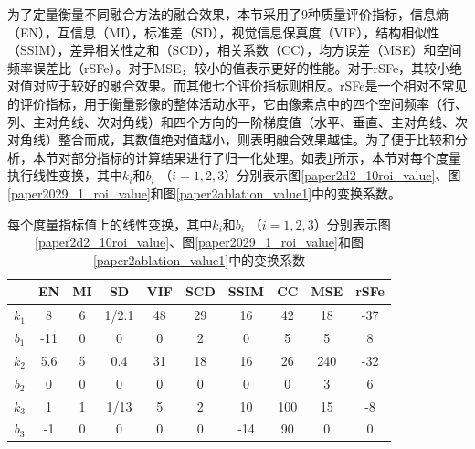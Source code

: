 为了定量衡量不同融合方法的融合效果，本节采用了9种质量评价指标，信息熵（EN）\cite{2008Assessment}，互信息（MI）\cite{2005Feature}，标准差（SD）\cite{Yun1997In}，视觉信息保真度（VIF）\cite{2013A}，结构相似性（SSIM）\cite{wang2004image}，差异相关性之和（SCD）\cite{Aslantas2015A}，相关系数（CC）\cite{han2008study}，均方误差（MSE）\cite{willmott2005advantages}和空间频率误差比（rSFe）\cite{2007A}。对于MSE，较小的值表示更好的性能。对于rSFe，其较小绝对值对应于较好的融合效果。而其他七个评价指标则相反。rSFe是一个相对不常见的评价指标，用于衡量影像的整体活动水平，它由像素点中的四个空间频率（行、列、主对角线、次对角线）和四个方向的一阶梯度值（水平、垂直、主对角线、次对角线）整合而成，其数值绝对值越小，则表明融合效果越佳。为了便于比较和分析，本节对部分指标的计算结果进行了归一化处理。如表\ref{lineTransformation}所示，本节对每个度量执行线性变换，其中$k_i$和$b_i$ （$i=1, 2, 3$）分别表示图\ref{paper2d2_10roi_value}、图\ref{paper2029_1_roi_value}和图\ref{paper2ablation_value1}中的变换系数。

\begin{table}[ht]
\centering
  \caption{每个度量指标值上的线性变换，其中$k_i$和$b_i$ （$i=1, 2, 3$）分别表示图\ref{paper2d2_10roi_value}、图\ref{paper2029_1_roi_value}和图\ref{paper2ablation_value1}中的变换系数}\label{lineTransformation}
\begin{tabular}{cccccccccc}
\hline
\textit{\textbf{}} & \textbf{EN} & \textbf{MI} & \textbf{SD} & \textbf{VIF} & \textbf{SCD} & \textbf{SSIM} & \textbf{CC}  & \textbf{MSE} & \textbf{rSFe} \\ \hline
$k_1$                 & 8           & 6           & 1/2.1     & 48           & 29  & 16   & 42  & 18  & -37  \\
$b_1$                 & -11         & 0           & 0           & 0            & 2   & 0    & 5   & 5   & 8    \\
$k_2$                 & 5.6         & 5           & 0.4         & 31           & 18  & 16   & 26  & 240 & -32  \\
$b_2$                 & 0           & 0           & 0           & 0            & 0   & 0    & 0   & 3   & 6    \\
$k_3$                 & 1           & 1           & 1/13     & 5            & 2   & 10   & 100 & 15  & -8   \\
$b_3$                 & -1          & 0           & 0           & 0            & 0   & -14  & 90  & 0   & 0    \\
\hline
\end{tabular}
\end{table}

